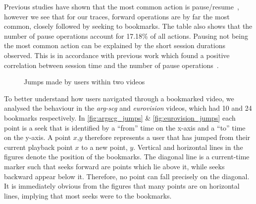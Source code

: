 Previous studies have shown that the most common action is pause/resume~\cite{costa2004aci}, however we see that for our traces, forward operations are by far the most common, closely followed by seeking to bookmarks. The table also shows that the number of pause operations account for 17.18\% of all actions. Pausing not being the most common action can be explained by the short session durations observed. This is in accordance with previous work which found a positive correlation between session time and the number of pause operations~\cite{vilas2005uba}.

\begin{figure}[t]
    \centering


    \caption{Jumps made by users within two videos}
    \label{fig:jumps}
\end{figure}

To better understand how users navigated through a bookmarked video, we analysed the behaviour in the \emph{arg-scg} and \emph{eurovision} videos, which had 10 and 24 bookmarks respectively. In \autoref{fig:argscg_jumps} \& \autoref{fig:eurovision_jumps} each point is a seek that is identified by a ``from'' time on the x-axis and a ``to'' time on the y-axis. A point $x$,$y$ therefore represents a user that has jumped from their current playback point $x$ to a new point, $y$. Vertical and horizontal lines in the figures denote the position of the bookmarks. The diagonal line is a current-time marker such that seeks forward are points which lie above it, while seeks backward appear below it. Therefore, no point can fall precisely on the diagonal. It is immediately obvious from the figures that many points are on horizontal lines, implying that most seeks were to the bookmarks.

